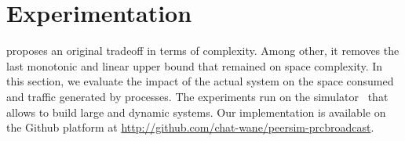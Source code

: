 
\section{Experimentation}
\label{sec:experimentation}

\RPCBROADCAST proposes an original tradeoff in terms of complexity. Among other,
it removes the last monotonic and linear upper bound that remained on space
complexity. In this section, we evaluate the impact of the actual system on the
space consumed and traffic generated by processes. The experiments run on the
\PEERSIM simulator~\cite{montresor2009peersim} that allows to build large and
dynamic systems. Our implementation is available on the Github platform at
\url{http://github.com/chat-wane/peersim-prcbroadcast}. \\


%   



